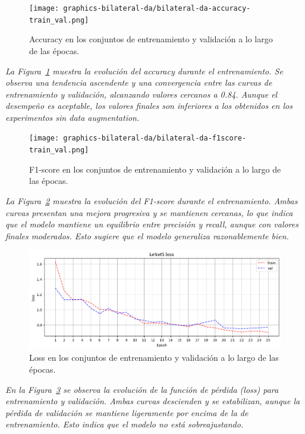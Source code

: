 \documentclass[conference]{IEEEtran}
\begin{document}

\begin{figure}[H]
    \centering
    \texttt{[image: graphics-bilateral-da/bilateral-da-accuracy-train\_val.png]}
    \caption{Accuracy en los conjuntos de entrenamiento y validación a lo largo de las épocas.}
    \label{fig:bilateral-da-accuracy-train_val}
\end{figure}
\noindent\textit{
La Figura~\ref{fig:bilateral-da-accuracy-train_val} muestra la evolución del accuracy durante el entrenamiento. Se observa una tendencia ascendente y una convergencia entre las curvas de entrenamiento y validación, alcanzando valores cercanos a 0.84. Aunque el desempeño es aceptable, los valores finales son inferiores a los obtenidos en los experimentos sin data augmentation.
}

\begin{figure}[H]
    \centering
    \texttt{[image: graphics-bilateral-da/bilateral-da-f1score-train\_val.png]}
    \caption{F1-score en los conjuntos de entrenamiento y validación a lo largo de las épocas.}
    \label{fig:bilateral-da-f1score-train_val}
\end{figure}
\noindent\textit{
La Figura~\ref{fig:bilateral-da-f1score-train_val} muestra la evolución del F1-score durante el entrenamiento. Ambas curvas presentan una mejora progresiva y se mantienen cercanas, lo que indica que el modelo mantiene un equilibrio entre precisión y recall, aunque con valores finales moderados. Esto sugiere que el modelo generaliza razonablemente bien.
}

\begin{figure}[H]
    \centering
    \includegraphics[width=0.95\linewidth]{graphics-bilateral-da/bilateral-da-loss-train_val.png}
    \caption{Loss en los conjuntos de entrenamiento y validación a lo largo de las épocas.}
    \label{fig:bilateral-da-loss-train_val}
\end{figure}
\noindent\textit{
En la Figura~\ref{fig:bilateral-da-loss-train_val} se observa la evolución de la función de pérdida (loss) para entrenamiento y validación. Ambas curvas descienden y se estabilizan, aunque la pérdida de validación se mantiene ligeramente por encima de la de entrenamiento. Esto indica que el modelo no está sobreajustando.
}
\end{document}
